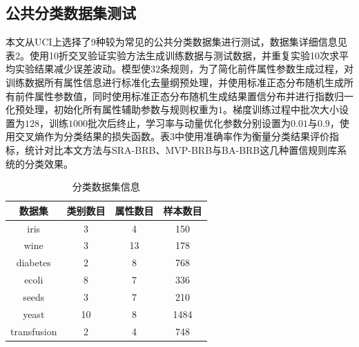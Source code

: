 \documentclass{cjc}
\begin{document}
\subsection{公共分类数据集测试}
本文从UCI上选择了9种较为常见的公共分类数据集进行测试，数据集详细信息见表2。使用10折交叉验证实验方法生成训练数据与测试数据，并重复实验10次求平均实验结果减少误差波动。模型使$32$条规则，为了简化前件属性参数生成过程，对训练数据所有属性信息进行标准化去量纲预处理，并使用标准正态分布随机生成所有前件属性参数值，同时使用标准正态分布随机生成结果置信分布并进行指数归一化预处理，初始化所有属性辅助参数与规则权重为$1$。梯度训练过程中批次大小设置为$128$，训练$1000$批次后终止，学习率与动量优化参数分别设置为$0.01$与$0.9$，使用交叉熵作为分类结果的损失函数。表3中使用准确率作为衡量分类结果评价指标，统计对比本文方法与SRA-BRB\cite{a21}、MVP-BRB\cite{a22}与BA-BRB\cite{a23}这几种置信规则库系统的分类效果。
\begin{table}
    \centering
    \caption{分类数据集信息}
    \begin{tabular}{cccc}
        \toprule
        数据集      & 类别数目 & 属性数目 & 样本数目 \\
        \midrule
        iris        & 3        & 4        & 150      \\
        wine        & 3        & 13       & 178      \\
        diabetes    & 2        & 8        & 768      \\
        ecoli       & 8        & 7        & 336      \\
        seeds       & 3        & 7        & 210      \\
        yeast       & 10       & 8        & 1484     \\
        transfusion & 2        & 4        & 748      \\
        \bottomrule
    \end{tabular}
\end{table}
\end{document}
